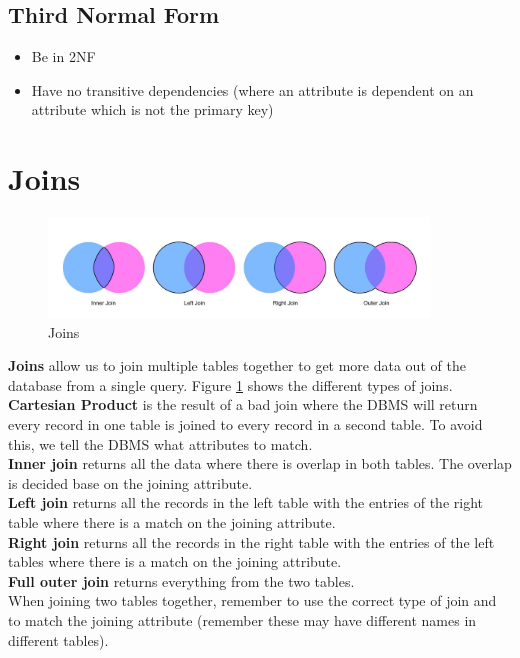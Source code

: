 \documentclass[a4paper,11pt]{article}
\begin{document}
\subsection{Third Normal Form}
\begin{itemize}
    \item Be in 2NF
    \item Have no transitive dependencies (where an attribute is dependent on an attribute which is not the primary key)
\end{itemize}

\section{Joins}
\begin{figure}[ht]
    \centering
    \includegraphics[width=0.9\textwidth]{../assets/joins.jpg}
    \caption{Joins}
    \label{fig:joins}  
\end{figure}
\textbf{Joins} allow us to join multiple tables together to get more data out of the database from a single query. Figure \ref*{fig:joins} shows the different types of joins.\\
\textbf{Cartesian Product} is the result of a bad join where the DBMS will return every record in one table is joined to every record in a second table. To avoid this, we tell the DBMS what attributes to match. \\
\textbf{Inner join} returns all the data where there is overlap in both tables. The overlap is decided base on the joining attribute.\\
\textbf{Left join} returns all the records in the left table with the entries of the right table where there is a match on the joining attribute.\\
\textbf{Right join} returns all the records in the right table with the entries of the left tables where there is a match on the joining attribute.\\
\textbf{Full outer join} returns everything from the two tables.\\
When joining two tables together, remember to use the correct type of join and to match the joining attribute (remember these may have different names in different tables). 
\end{document}

